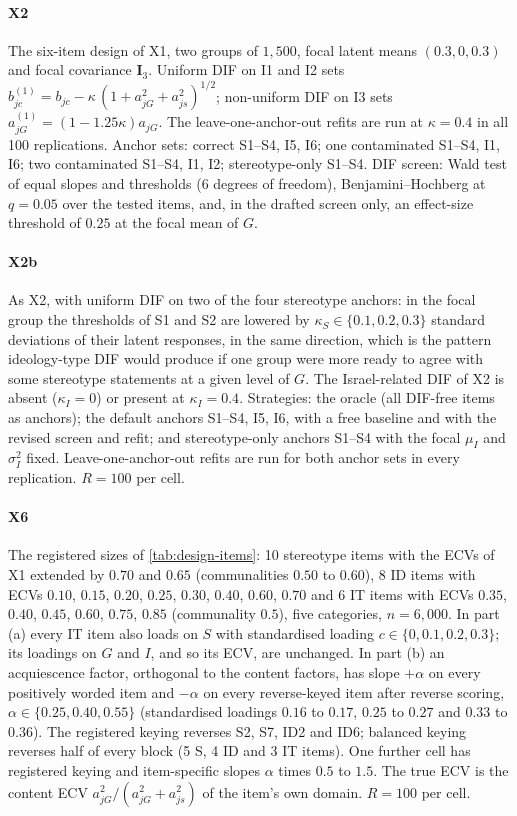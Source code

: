\paragraph{X2}
The six-item design of X1, two groups of $1{,}500$, focal latent means $(0.3,0,0.3)$ and focal covariance $\bm I_3$. Uniform DIF on I1 and I2 sets $b^{(1)}_{jc}=b_{jc}-\kappa\,(1+a_{jG}^2+a_{js}^2)^{1/2}$; non-uniform DIF on I3 sets $a^{(1)}_{jG}=(1-1.25\kappa)a_{jG}$. The leave-one-anchor-out refits are run at $\kappa=0.4$ in all 100 replications. Anchor sets: correct S1--S4, I5, I6; one contaminated S1--S4, I1, I6; two contaminated S1--S4, I1, I2; stereotype-only S1--S4. DIF screen: Wald test of equal slopes and thresholds (6 degrees of freedom), Benjamini--Hochberg at $q=0.05$ over the tested items, and, in the drafted screen only, an effect-size threshold of $0.25$ at the focal mean of $G$.

\paragraph{X2b}
As X2, with uniform DIF on two of the four stereotype anchors: in the focal group the thresholds of S1 and S2 are lowered by $\kappa_S\in\{0.1,0.2,0.3\}$ standard deviations of their latent responses, in the same direction, which is the pattern ideology-type DIF would produce if one group were more ready to agree with some stereotype statements at a given level of $G$. The Israel-related DIF of X2 is absent ($\kappa_I=0$) or present at $\kappa_I=0.4$. Strategies: the oracle (all DIF-free items as anchors); the default anchors S1--S4, I5, I6, with a free baseline and with the revised screen and refit; and stereotype-only anchors S1--S4 with the focal $\mu_I$ and $\sigma_I^2$ fixed. Leave-one-anchor-out refits are run for both anchor sets in every replication. $R=100$ per cell.

\paragraph{X6}
The registered sizes of \cref{tab:design-items}: 10 stereotype items with the ECVs of X1 extended by $0.70$ and $0.65$ (communalities $0.50$ to $0.60$), 8 ID items with ECVs $0.10$, $0.15$, $0.20$, $0.25$, $0.30$, $0.40$, $0.60$, $0.70$ and 6 IT items with ECVs $0.35$, $0.40$, $0.45$, $0.60$, $0.75$, $0.85$ (communality $0.5$), five categories, $n=6{,}000$. In part (a) every IT item also loads on $S$ with standardised loading $c\in\{0,0.1,0.2,0.3\}$; its loadings on $G$ and $I$, and so its ECV, are unchanged. In part (b) an acquiescence factor, orthogonal to the content factors, has slope $+\alpha$ on every positively worded item and $-\alpha$ on every reverse-keyed item after reverse scoring, $\alpha\in\{0.25,0.40,0.55\}$ (standardised loadings $0.16$ to $0.17$, $0.25$ to $0.27$ and $0.33$ to $0.36$). The registered keying reverses S2, S7, ID2 and ID6; balanced keying reverses half of every block (5 S, 4 ID and 3 IT items). One further cell has registered keying and item-specific slopes $\alpha$ times $0.5$ to $1.5$. The true ECV is the content ECV $a_{jG}^2/(a_{jG}^2+a_{js}^2)$ of the item's own domain. $R=100$ per cell.

